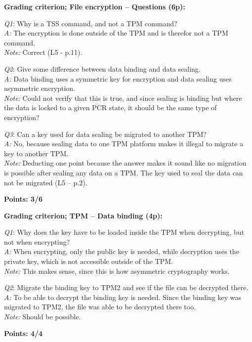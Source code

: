 \documentclass{article}
\newcommand{\grade}[5]{
  \textbf{Grading criterion; #1 (#3p):}\textit{#4}

  #5
  \hfill
  \begin{varwidth}{\linewidth}
    \textbf{Points: #2/#3}
  \end{varwidth}
}
\newcommand{\QAN}[5]{
  \textit{Q#1}:#3  \\
  \ifthenelse{\equal{#2}{C}}{
    \def \grading {\Large\textcolor{green}{\checkmark}\normalsize}
  }{
    \def \grading {\Large\textcolor{red}{\textbf{x}\hspace{0.142cm}}\normalsize}
  }
  \textit{A:}#4\hfill\grading \\
  \textit{Note:}#5
}
\newcommand{\escape}[1]{\PVerb{#1}}
\begin{document}
  \grade{File encryption -- Questions}{3}{6}
  {}
  {
    \QAN{1}{C}{ %
      Why is \escape{TSS_Bind} a TSS command, and not a TPM command?
    }{ %
      The encryption is done outside of the TPM and is therefor not a TPM
      command.
    }{ %
      Correct (L5 - p.11).
    }

    \QAN{2}{F}{ %
      Give some difference between data binding and data sealing.
    }{ %
      Data binding uses a symmetric key for encryption and data sealing uses
      asymmetric encryption.
    }{ %
      Could not verify that this is true, and since sealing is binding but
      where the data is locked to a given PCR state, it should be the same type
      of encryption?
    }

    \QAN{3}{F}{ %
      Can a key used for data sealing be migrated to another TPM?
    }{ %
      No, because sealing data to one TPM platform makes it illegal to migrate
      a key to another TPM.
    }{ %
      Deducting one point because the answer makes it sound like no migration
      is possible after sealing any data on a TPM. The key used to seal the
      data can not be migrated (L5 -- p.2).
    }
  }

  \grade{TPM -- Data binding}{4}{4}
  {}
  {
    \QAN{1}{C}{ %
      Why does the key have to be loaded inside the TPM when decrypting, but
      not when encrypting?
    }{ %
      When encrypting, only the public key is needed, while decryption uses the
      private key, which is not accessible outside of the TPM.
    }{ %
      This makes sense, since this is how asymmetric cryptography works.
    }

    \QAN{2}{C}{ %
      Migrate the binding key to TPM2 and see if the file can be decrypted
      there.
    }{ %
      To be able to decrypt the binding key is needed. Since the binding key
      was migrated to TPM2, the file was able to be decrypted there too.
    }{ %
      Should be possible.
    }
  }
\end{document}

